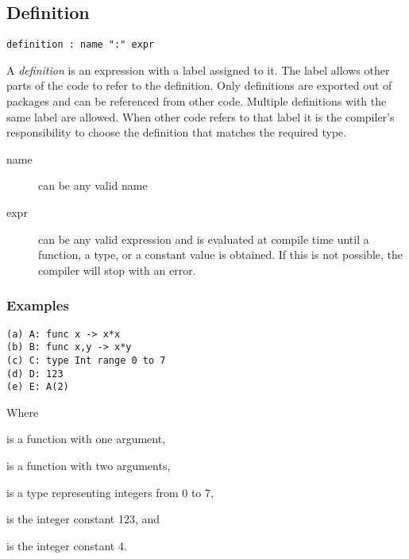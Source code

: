 \subsection{Definition}

\begin{lstlisting}[language=EBNF]
definition : name ":" expr
\end{lstlisting}

A \emph{definition} is an expression with a label assigned to it. The label
allows other parts of the code to refer to the definition. Only definitions are
exported out of packages and can be referenced from other code. Multiple
definitions with the same label are allowed. When other code refers to that
label it is the compiler's responsibility to choose the definition that matches
the required type.

\begin{description}
\item[name] can be any valid name
\item[expr] can be any valid expression and is evaluated at compile time until a
            function, a type, or a constant value is obtained. If this is not
            possible, the compiler will stop with an error.
\end{description}

\subsubsection{Examples}
\begin{lstlisting}
(a) A: func x -> x*x
(b) B: func x,y -> x*y
(c) C: type Int range 0 to 7
(d) D: 123
(e) E: A(2)
\end{lstlisting}

Where \begin{exdesc}
	\item is a function with one argument,
	\item is a function with two arguments,
	\item is a type representing integers from 0 to 7,
	\item is the integer constant 123, and
	\item is the integer constant 4.
\end{exdesc}
